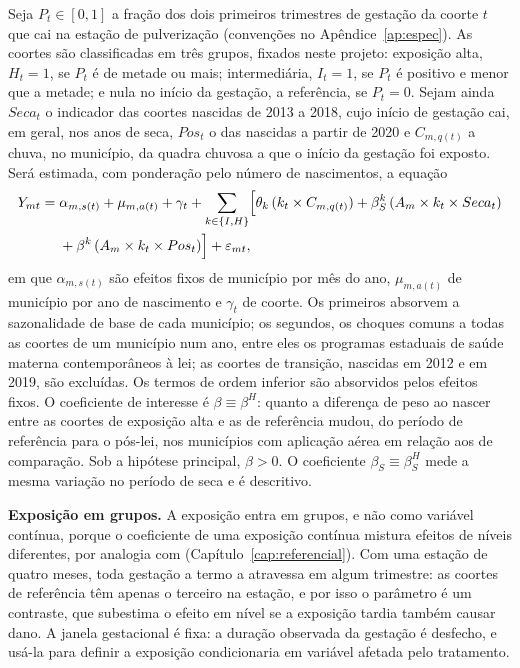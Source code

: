 Seja $P_t \in [0,1]$ a fração dos dois primeiros trimestres de gestação da
coorte $t$ que cai na estação de pulverização (convenções no
Apêndice~\ref{ap:espec}). As coortes são classificadas em três grupos, fixados
neste projeto: exposição alta, $H_t = 1$, se $P_t$ é de metade ou mais;
intermediária, $I_t = 1$, se $P_t$ é positivo e menor que a metade; e nula no
início da gestação, a referência, se $P_t = 0$. Sejam ainda $Seca_t$ o
indicador das coortes nascidas de 2013 a 2018, cujo início de gestação cai, em
geral, nos anos de seca, $Pos_t$ o das nascidas a partir de 2020 e
$C_{m,q(t)}$ a chuva, no município, da quadra chuvosa a que o início da
gestação foi exposto. Será estimada, com ponderação pelo número de
nascimentos, a equação
\begin{equation}
\begin{split}
  Y_{mt} ={}& \alpha_{m,s(t)} + \mu_{m,a(t)} + \gamma_t
   + \sum_{k \in \{I,H\}} \Bigl[\theta_k\,(k_t \times C_{m,q(t)})
   + \beta^k_S\,(A_m \times k_t \times Seca_t) \\
  & + \beta^k\,(A_m \times k_t \times Pos_t)\Bigr] + \varepsilon_{mt},
\end{split}
\label{eq:ddd}
\end{equation}
em que $\alpha_{m,s(t)}$ são efeitos fixos de município por mês do ano,
$\mu_{m,a(t)}$ de município por ano de nascimento e $\gamma_t$ de coorte. Os
primeiros absorvem a sazonalidade de base de cada município; os segundos, os
choques comuns a todas as coortes de um município num ano, entre eles os
programas estaduais de saúde materna contemporâneos à lei; as coortes de
transição, nascidas em 2012 e em 2019, são excluídas. Os termos de ordem
inferior são absorvidos pelos efeitos fixos. O coeficiente de interesse é
$\beta \equiv \beta^H$: quanto a diferença de peso ao nascer entre as coortes
de exposição alta e as de referência mudou, do período de referência para o
pós-lei, nos municípios com aplicação aérea em relação aos de comparação. Sob
a hipótese principal, $\beta > 0$. O coeficiente $\beta_S \equiv \beta^H_S$
mede a mesma variação no período de seca e é descritivo.

\textbf{Exposição em grupos.} A exposição entra em grupos, e não como variável
contínua, porque o coeficiente de uma exposição contínua mistura efeitos de
níveis diferentes, por analogia com 
(Capítulo~\ref{cap:referencial}). Com uma estação de quatro meses, toda
gestação a termo a atravessa em algum trimestre: as coortes de referência têm
apenas o terceiro na estação, e por isso o parâmetro é um contraste, que
subestima o efeito em nível se a exposição tardia também causar dano. A janela
gestacional é fixa: a duração observada da gestação é desfecho, e usá-la para
definir a exposição condicionaria em variável afetada pelo tratamento.

